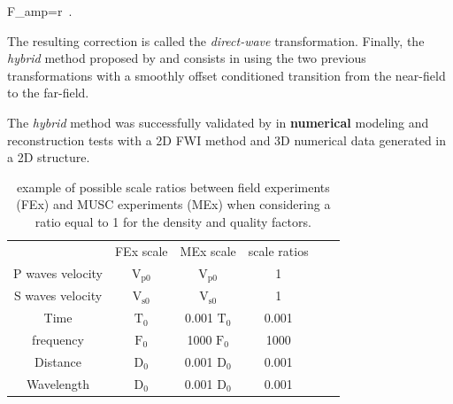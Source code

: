 \documentclass[extra,mreferee]{gji}
\newenvironment{greennote}{\par\color{OliveGreen}}{\par}
\begin{document}
\begin{greennote}
\equation
\label{eq:direct-wave}
F_{amp}=r\ .
\endequation

The resulting correction is called the \textit{direct-wave} transformation. Finally, the \textit{hybrid} method proposed by \cite{Forbriger_LSS_2014} and \cite{schafer_lss_2014} consists in using the two previous transformations with a smoothly offset conditioned transition from the near-field to the far-field.

The \textit{hybrid} method was successfully validated by \cite{schafer_lss_2014} in \textbf{numerical} modeling and reconstruction tests with a 2D FWI method and 3D numerical data generated in a 2D structure. 
\end{greennote}

\clearpage
\newpage

\begin{table}
\centering
\caption{ example of possible scale ratios between field experiments (FEx) and MUSC experiments (MEx) when considering a ratio equal to 1 for the density and quality factors.}
\begin{tabular}{cccccc}
\quad & FEx scale & MEx scale & scale ratios \\
P waves velocity & $\mathrm{V_{p 0}}$ & $\mathrm{V_{p 0}}$ & 1 \\
S waves velocity & $\mathrm{V_{s 0}}$ & $\mathrm{V_{s 0}}$ & 1 \\
Time & $\mathrm{T_{0}}$ & 0.001 $\mathrm{T_{0}}$ & 0.001 \\
frequency & $\mathrm{F_{0}}$ & 1000 $\mathrm{F_{0}}$ & 1000 \\
Distance & $\mathrm{D_{0}}$ & 0.001 $\mathrm{D_{0}}$ & 0.001 \\
Wavelength & $\mathrm{D_{0}}$ & 0.001 $\mathrm{D_{0}}$ & 0.001 \\
\end{tabular}
\label{epoxy-resin}
\end{table}

\clearpage
\newpage
\end{document}
